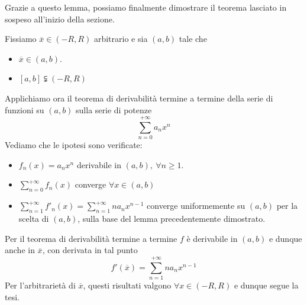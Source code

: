 Grazie a questo lemma, possiamo finalmente dimostrare il teorema lasciato in sospeso all'inizio della sezione.
\begin{demonstration}
	Fissiamo $\overline{x}\in\left(-R,R\right)$ arbitrario e sia $\left(a,b\right)$ tale che
	\begin{itemize}
		\item $\overline{x}\in\left(a,b\right)$.
		\item $\left[a,b\right]\subsetneqq\left(-R,R\right)$
	\end{itemize}
Applichiamo ora il teorema di derivabilità termine a termine della serie di funzioni su $\left(a,b\right)$ sulla serie di potenze
\begin{equation*}
	\sum_{n=0}^{+\infty}a_nx^n
\end{equation*}
Vediamo che le ipotesi sono verificate:
\begin{itemize}
	\item $f_n(x)=a_nx^n$ derivabile in $\left(a,b\right),\ \forall n\geq 1$.
	\item $\displaystyle\sum_{n=0}^{+\infty}f_n(x)$ converge $\forall x\in\left(a,b\right)$
	\item $\displaystyle\sum_{n=1}^{+\infty}f'_n(x)=\sum_{n=1}^{+\infty}na_nx^{n-1}$ converge uniformemente su $\left(a,b\right)$ per la scelta di $\left(a,b\right)$, sulla base del lemma precedentemente dimostrato.
\end{itemize}
Per il teorema di derivabilità termine a termine $f$ è derivabile in $\left(a,b\right)$ e dunque anche in $\overline{x}$, con derivata in tal punto
\begin{equation*}
	f'\left(\overline{x}\right)=\sum_{n=1}^{+\infty}na_nx^{n-1}
\end{equation*}
Per l'arbitrarietà di $\overline{x}$, questi risultati valgono $\forall x\in\left(-R,R\right)$ e dunque segue la tesi.
\end{demonstration}

